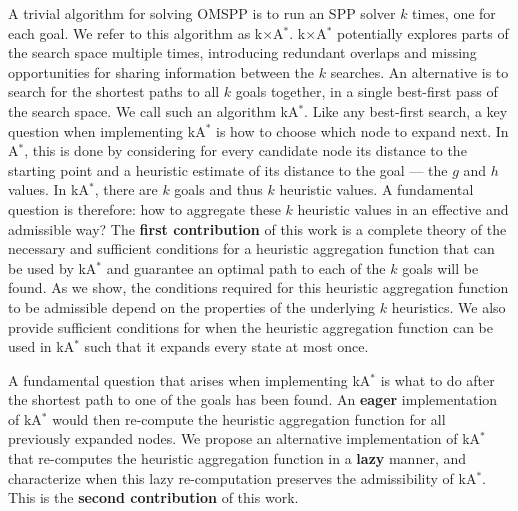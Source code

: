 \documentclass[smallextended]{svjour3}       %
\newcommand{\omspp}{\ac{OMSPP}\xspace}
\newcommand{\spp}{\ac{SPP}\xspace}
\newcommand{\astar}{A$^*$\xspace}
\newcommand{\kastar}{kA$^*$\xspace}
\newcommand{\kxastar}{k$\times$A$^*$\xspace}
\begin{document}
A trivial algorithm for solving \omspp is to run an \spp solver $k$ times, one for each goal. 
We refer to this algorithm as \kxastar. \kxastar potentially explores parts of the search space multiple times, introducing redundant overlaps and missing opportunities for sharing information between the $k$ searches. An alternative is to search for the shortest paths to all $k$ goals together, in a single best-first pass of the search space. We call such an algorithm \kastar. Like any best-first search, a key question when implementing \kastar is how to choose which node to expand next. 
In \astar{}, this is done by considering for every candidate node its distance to the starting point and a heuristic estimate of its distance to the goal --- the $g$ and $h$ values. In \kastar{}, there are $k$ goals and thus $k$ heuristic values. A fundamental question is therefore: how to aggregate these $k$ heuristic values in an effective and admissible way?
 The \textbf{first contribution} of this work is a complete theory of the necessary and sufficient conditions for a heuristic aggregation function that can be used by \kastar and guarantee an optimal path to each of the $k$ goals will be found. As we show, the conditions required for this heuristic aggregation function to be admissible depend on the properties of the underlying $k$ heuristics.  
We also provide sufficient conditions for when the heuristic aggregation function can be used in \kastar such that it expands every state at most once.


A fundamental question that arises when implementing \kastar is what to do after the shortest path to one of the goals has been found. An \textbf{eager} implementation of \kastar would then re-compute the heuristic aggregation function for all previously expanded nodes. We propose an alternative implementation of \kastar that re-computes the heuristic aggregation function in a \textbf{lazy} manner, and characterize when this lazy re-computation preserves the admissibility of \kastar. 
This is the \textbf{second contribution} of this work. 
\end{document}
